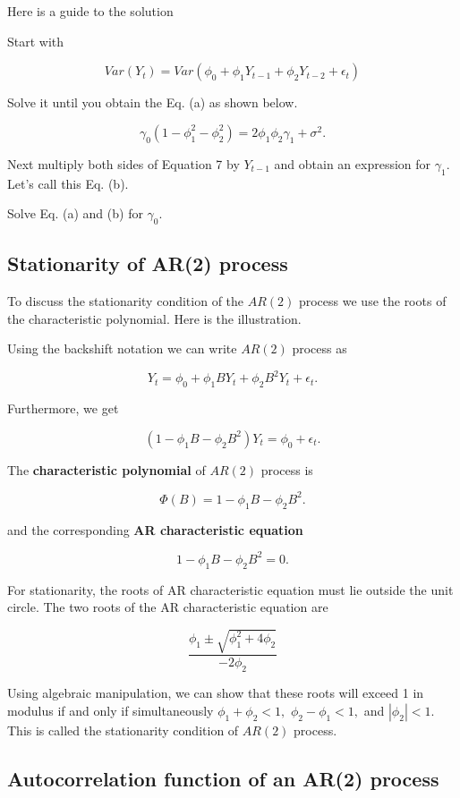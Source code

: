 \documentclass[
  11pt,
  a4paper,
]{report}
\begin{document}
Here is a guide to the solution

Start with

\[Var(Y_t)=Var(\phi_0+\phi_1Y_{t-1}+\phi_2Y_{t-2}+\epsilon_t)\]

Solve it until you obtain the Eq. (a) as shown below.

\begin{equation}
\gamma_0 (1-\phi_1^2 - \phi_2^2) = 2\phi_1\phi_2\gamma_1+\sigma^2.
\end{equation}

Next multiply both sides of Equation 7 by \(Y_{t-1}\) and obtain an
expression for \(\gamma_1\). Let's call this Eq. (b).

Solve Eq. (a) and (b) for \(\gamma_0.\)

\subsection{Stationarity of AR(2)
process}\label{stationarity-of-ar2-process}

To discuss the stationarity condition of the \(AR(2)\) process we use
the roots of the characteristic polynomial. Here is the illustration.

Using the backshift notation we can write \(AR(2)\) process as

\[Y_t = \phi_0 + \phi_1 BY_{t} + \phi_2 B^2 Y_{t} + \epsilon_t.\]

Furthermore, we get

\[(1-\phi_1 B - \phi_2 B^2) Y_t = \phi_0 + \epsilon_t.\]

The \textbf{characteristic polynomial} of \(AR(2)\) process is

\[\Phi(B)=1-\phi_1 B - \phi_2 B^2.\]

and the corresponding \textbf{AR characteristic equation}

\[1-\phi_1 B - \phi_2 B^2=0.\]

For stationarity, the roots of AR characteristic equation must lie
outside the unit circle. The two roots of the AR characteristic equation
are

\[\frac{\phi_1 \pm \sqrt{\phi_1^2 + 4\phi_2}}{-2\phi_2}\]

Using algebraic manipulation, we can show that these roots will exceed 1
in modulus if and only if simultaneously \(\phi_1 + \phi_2 < 1,\)
\(\phi_2-\phi_1 < 1,\) and \(|\phi_2| < 1.\) This is called the
stationarity condition of \(AR(2)\) process.

\subsection{Autocorrelation function of an AR(2)
process}\label{autocorrelation-function-of-an-ar2-process}
\end{document}
